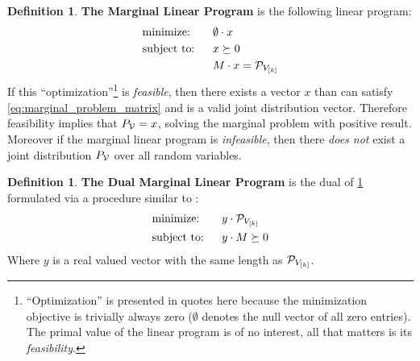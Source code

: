 \documentclass[aps, 10pt, english, twoside, pra, nofootinbib, longbibliography]{revtex4-1}
\theoremstyle{plain}
\theoremstyle{definition}
\newtheorem{definition}[theorem]{Definition}
\theoremstyle{remark}
\newcommand{\term}[1]{\textcolor{Mahogany}{\textbf{#1}}}
\begin{document}
    \begin{definition}
        \label{def:marginal_linear_program}
        \term{The Marginal Linear Program} is the following linear program:
        \begin{alignat*}{2}
            & \text{minimize:} \quad&& \emptyset \cdot x\\
            & \text{subject to:} && x \succeq 0 \\
            & && M \cdot x = \probvec[V_{\bs{k}}]
        \end{alignat*}
        If this ``optimization''\footnote{``Optimization'' is presented in quotes here because the minimization objective is trivially always zero ($\emptyset$ denotes the null vector of all zero entries). The primal value of the linear program is of no interest, all that matters is its \textit{feasibility}.} is \textit{feasible}, then there exists a vector $x$ than can satisfy \cref{eq:marginal_problem_matrix} and is a valid joint distribution vector. Therefore feasibility implies that $\prob[\mathcal{V}] = x$, solving the marginal problem with positive result. Moreover if the marginal linear program is \textit{infeasible}, then there \textit{does not} exist a joint distribution $\prob[\mathcal{V}]$ over all random variables.
    \end{definition}
    \begin{definition}
        \label{def:dual_marginal_linear_program}
        \term{The Dual Marginal Linear Program} is the dual of \cref{def:marginal_linear_program} formulated via a procedure similar to \cite{Lahaie_2008}:
        \begin{alignat*}{2}
            & \text{minimize:} \quad&& y \cdot \probvec[V_{\bs{k}}]\\
            & \text{subject to:} && y \cdot M \succeq 0
        \end{alignat*}
        Where $y$ is a real valued vector with the same length as $\probvec[V_{\bs{k}}]$.
    \end{definition}
\end{document}
